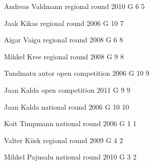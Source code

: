 \documentclass[11pt]{article}
\begin{document}
\ylDisplay{} %
{Andreas Valdmann} %
{regional round} %
{2010} %
{G 6} %
{5} %
{

\ifEngSolution
\fi
}

\ylDisplay{} %
{Jaak Kikas} %
{regional round} %
{2006} %
{G 10} %
{7} %
{

\ifEngSolution
\fi
}

\ylDisplay{} %
{Aigar Vaigu} %
{regional round} %
{2008} %
{G 6} %
{8} %
{

\ifEngSolution
\fi
}

\ylDisplay{} %
{Mihkel Kree} %
{regional round} %
{2008} %
{G 9} %
{8} %
{

\ifEngSolution
\fi
}

\ylDisplay{} %
{Tundmatu autor} %
{open competition} %
{2006} %
{G 10} %
{9} %
{

\ifEngSolution
\fi
}

\ylDisplay{} %
{Jaan Kalda} %
{open competition} %
{2011} %
{G 9} %
{9} %
{

\ifEngSolution
\fi
}

\ylDisplay{} %
{Jaan Kalda} %
{national round} %
{2006} %
{G 10} %
{10} %
{

\ifEngSolution
\fi
}

\ylDisplay{} %
{Koit Timpmann} %
{national round} %
{2006} %
{G 1} %
{1} %
{

\ifEngSolution
\fi
}

\ylDisplay{} %
{Valter Kiisk} %
{regional round} %
{2009} %
{G 4} %
{2} %
{

\ifEngSolution
\fi
}

\ylDisplay{} %
{Mihkel Pajusalu} %
{national round} %
{2010} %
{G 3} %
{2} %
{

\ifEngSolution
\fi
}
\end{document}
